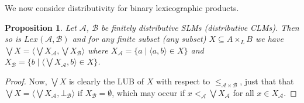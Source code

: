 \documentclass[a4paper]{elsarticle}
\newtheorem{proposition}{Proposition}
\newcommand{\1}{\mathbf{1}}
\begin{document}
We now consider distributivity for binary lexicographic products.

\begin{proposition}\label{def:lexBI}
Let $\mathcal{A}$, $\mathcal{B}$ be finitely distributive SLMs (distributive CLMs).
Then so is $Lex(\mathcal{A}, \mathcal{B})$ and for any finite subset (any subset) $X \subseteq A \times_L B$ 
we have $\bigvee X = \langle \bigvee X_\mathcal{A}, \bigvee X_\mathcal{B} \rangle$ 
where $X_\mathcal{A} = \{ a \mid \langle a, b \rangle \in X\}$
and $X_\mathcal{B} = \{ b \mid \langle \bigvee X_\mathcal{A}, b \rangle \in X\}$.
\end{proposition}
\begin{proof}
	Now, $\bigvee X$ is clearly the LUB of $X$ with respect to $\leq_{\mathcal{A} \times \mathcal{B}}$,
	just that that $\bigvee X =  \langle \bigvee X_\mathcal{A}, \bot_\mathcal{B} \rangle$ if 
	$X_\mathcal{B} = \emptyset$, which may occur if $x <_\mathcal{A} \bigvee X_\mathcal{A}$ for all 
	$x \in X_\mathcal{A}$.


\end{proof}
\end{document}

